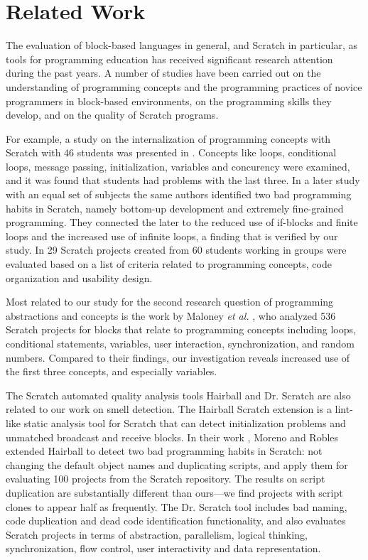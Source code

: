 \documentclass{sig-alternate}
\begin{document}
\section{Related Work}
\label{sec:related}

The evaluation of block-based languages in general, and Scratch in particular, as tools for programming education has received significant research attention during the past years. A number of studies have been carried out on the understanding of programming concepts and the programming practices of novice programmers in block-based environments, on the programming skills they develop, and on the quality of Scratch programs.

For example, a study on the internalization of programming concepts with Scratch with 46 students was presented in \cite{meerbaum-salant_learning_2010}. Concepts like loops, conditional loops, message passing, initialization, variables and concurency were examined, and it was found that students had problems with the last three. In a later study with an equal set of subjects \cite{Meerbaum_habits_2011} the same authors identified two bad programming habits in Scratch, namely bottom-up development and extremely fine-grained programming. They connected the later to the reduced use of if-blocks and finite loops and the increased use of infinite loops, a finding that is verified by our study. In \cite{wilson_evaluation_2012} 29 Scratch projects created from 60 students working in groups were evaluated based on a list of criteria related to programming concepts, code organization and usability design.

Most related to our study for the second research question of programming abstractions and concepts is the work by Maloney \emph{et al.} \cite{Maloney_2008}, who analyzed 536 Scratch projects for blocks that relate to programming concepts including loops, conditional statements, variables, user interaction, synchronization, and random numbers. Compared to their findings, our investigation reveals increased use of the first three concepts, and especially variables.

The Scratch automated quality analysis tools Hairball \cite{boe_hairball:_2013} and Dr. Scratch \cite{moreno-leon_dr._2015} are also related to our work on smell detection. The Hairball Scratch extension is a lint-like static analysis tool for Scratch that can detect initialization problems and unmatched broadcast and receive blocks. In their work \cite{moreno_automatic_2014}, Moreno and Robles extended Hairball to detect two bad programming habits in Scratch: not changing the default object names and duplicating scripts, and apply them for evaluating 100 projects from the Scratch repository. The results on script duplication are substantially different than ours---we find projects with script clones to appear half as frequently. The Dr. Scratch tool \cite{moreno-leon_dr._2015} includes bad naming, code duplication and dead code identification functionality, and also evaluates Scratch projects in terms of abstraction, parallelism, logical thinking, synchronization, flow control, user interactivity and data representation.
\end{document}
